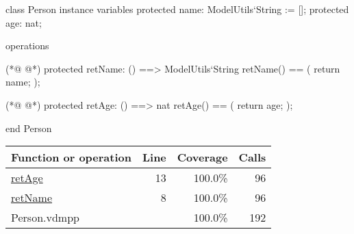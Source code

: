 \begin{vdmpp}[breaklines=true]
class Person
instance variables
  protected name: ModelUtils`String := [];
  protected age: nat;
  
operations

(*@
\label{retName:8}
@*)
  protected retName: () ==> ModelUtils`String
  retName() == (
    return name;  
  );
 
(*@
\label{retAge:13}
@*)
  protected retAge: () ==> nat
  retAge() == (
    return age;  
  );
  

end Person
\end{vdmpp}
\bigskip
\begin{longtable}{|l|r|r|r|}
\hline
Function or operation & Line & Coverage & Calls \\
\hline
\hline
\hyperref[retAge:13]{retAge} & 13&100.0\% & 96 \\
\hline
\hyperref[retName:8]{retName} & 8&100.0\% & 96 \\
\hline
\hline
Person.vdmpp & & 100.0\% & 192 \\
\hline
\end{longtable}

